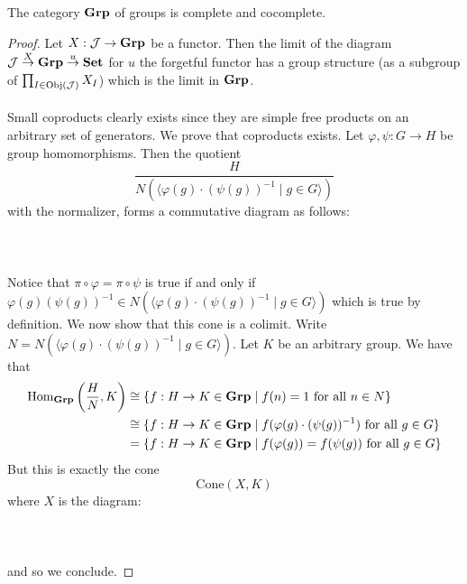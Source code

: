 \documentclass[a4paper]{article}
\begin{document}
\begin{crl}{}{} The category $\bold{Grp}$ of groups is complete and cocomplete. \tcbline
\begin{proof}
Let $X:\mathcal{J}\to\bold{Grp}$ be a functor. Then the limit of the diagram $\mathcal{J}\overset{X}{\to}\bold{Grp}\overset{u}{\to}\bold{Set}$ for $u$ the forgetful functor has a group structure (as a subgroup of $\prod_{I\in\text{Obj}(\mathcal{J})}X_I$) which is the limit in $\bold{Grp}$. \\~\\

Small coproducts clearly exists since they are simple free products on an arbitrary set of generators. We prove that coproducts exists. Let $\varphi,\psi:G\to H$ be group homomorphisms. Then the quotient $$\frac{H}{N(\langle\varphi(g)\cdot(\psi(g))^{-1}\;|\;g\in G\rangle)}$$ with the normalizer, forms a commutative diagram as follows: \\~\\
 \\~\\
Notice that $\pi\circ\varphi=\pi\circ\psi$ is true if and only if $\varphi(g)(\psi(g))^{-1}\in N(\langle\varphi(g)\cdot(\psi(g))^{-1}\;|\;g\in G\rangle)$ which is true by definition. We now show that this cone is a colimit. Write $N=N(\langle\varphi(g)\cdot(\psi(g))^{-1}\;|\;g\in G\rangle)$. Let $K$ be an arbitrary group. We have that 
\begin{align*}
\operatorname{Hom}_{\bold{Grp}}\left(\frac{H}{N},K\right)&\cong\{f:H\to K\in\bold{Grp}\;|\;f(n)=1\text{ for all }n\in N\}\\
&\cong\{f:H\to K\in\bold{Grp}\;|\;f(\varphi(g)\cdot(\psi(g))^{-1})\text{ for all }g\in G\}\\
&=\{f:H\to K\in\bold{Grp}\;|\;f(\varphi(g))=f(\psi(g))\text{ for all }g\in G\}
\end{align*}
But this is exactly the cone $$\text{Cone}\left(X,K\right)$$ where $X$ is the diagram: \\~\\
 \\~\\
and so we conclude. 
\end{proof}
\end{crl}
\end{document}
